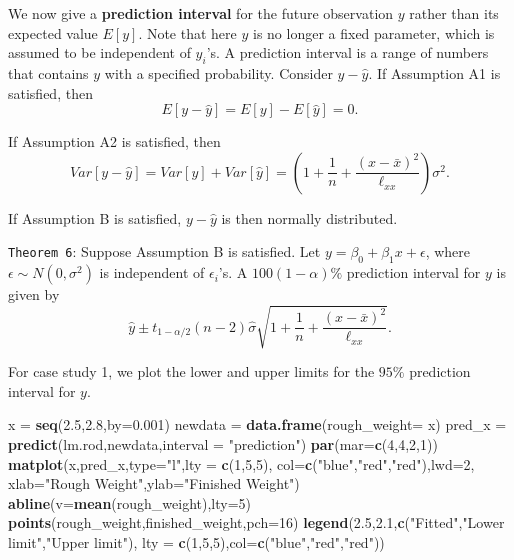 \documentclass[]{article}
\newenvironment{Shaded}{\begin{snugshade}}{\end{snugshade}}
\newcommand{\DataTypeTok}[1]{\textcolor[rgb]{0.13,0.29,0.53}{#1}}
\newcommand{\DecValTok}[1]{\textcolor[rgb]{0.00,0.00,0.81}{#1}}
\newcommand{\FloatTok}[1]{\textcolor[rgb]{0.00,0.00,0.81}{#1}}
\newcommand{\KeywordTok}[1]{\textcolor[rgb]{0.13,0.29,0.53}{\textbf{#1}}}
\newcommand{\NormalTok}[1]{#1}
\newcommand{\StringTok}[1]{\textcolor[rgb]{0.31,0.60,0.02}{#1}}
\begin{document}
We now give a \textbf{prediction interval} for the future observation
\(y\) rather than its expected value \(E[y]\). Note that here \(y\) is
no longer a fixed parameter, which is assumed to be independent of
\(y_i\)'s. A prediction interval is a range of numbers that contains
\(y\) with a specified probability. Consider \(y-\hat y\). If Assumption
A1 is satisfied, then \[E[y-\hat y] = E[y]-E[\hat y]= 0.\]

If Assumption A2 is satisfied, then
\[Var[y-\hat y] = Var[y]+Var[\hat y]=\left(1+\frac{1}{n}+\frac{(x-\bar x)^2}{\ell_{xx}}\right)\sigma^2.\]

If Assumption B is satisfied, \(y-\hat y\) is then normally distributed.

\texttt{Theorem\ 6}: Suppose Assumption B is satisfied. Let
\(y=\beta_0+\beta_1x+\epsilon\), where \(\epsilon\sim N(0,\sigma^2)\) is
independent of \(\epsilon_i\)'s. A \(100(1−\alpha)\%\) prediction
interval for \(y\) is given by
\[\hat y\pm t_{1-\alpha/2}(n-2)\hat{\sigma}\sqrt{1+\frac{1}{n}+\frac{(x-\bar x)^2}{\ell_{xx}}}.\]

For case study 1, we plot the lower and upper limits for the \(95\%\)
prediction interval for \(y\).

\begin{Shaded}
\begin{Highlighting}[]
\NormalTok{x =}\StringTok{ }\KeywordTok{seq}\NormalTok{(}\FloatTok{2.5}\NormalTok{,}\FloatTok{2.8}\NormalTok{,}\DataTypeTok{by=}\FloatTok{0.001}\NormalTok{)}
\NormalTok{newdata =}\StringTok{ }\KeywordTok{data.frame}\NormalTok{(}\DataTypeTok{rough_weight=}\NormalTok{ x)}
\NormalTok{pred_x =}\StringTok{ }\KeywordTok{predict}\NormalTok{(lm.rod,newdata,}\DataTypeTok{interval =} \StringTok{"prediction"}\NormalTok{)}
\KeywordTok{par}\NormalTok{(}\DataTypeTok{mar=}\KeywordTok{c}\NormalTok{(}\DecValTok{4}\NormalTok{,}\DecValTok{4}\NormalTok{,}\DecValTok{2}\NormalTok{,}\DecValTok{1}\NormalTok{))}
\KeywordTok{matplot}\NormalTok{(x,pred_x,}\DataTypeTok{type=}\StringTok{"l"}\NormalTok{,}\DataTypeTok{lty =} \KeywordTok{c}\NormalTok{(}\DecValTok{1}\NormalTok{,}\DecValTok{5}\NormalTok{,}\DecValTok{5}\NormalTok{),}
        \DataTypeTok{col=}\KeywordTok{c}\NormalTok{(}\StringTok{"blue"}\NormalTok{,}\StringTok{"red"}\NormalTok{,}\StringTok{"red"}\NormalTok{),}\DataTypeTok{lwd=}\DecValTok{2}\NormalTok{,}
        \DataTypeTok{xlab=}\StringTok{"Rough Weight"}\NormalTok{,}\DataTypeTok{ylab=}\StringTok{"Finished Weight"}\NormalTok{)}
\KeywordTok{abline}\NormalTok{(}\DataTypeTok{v=}\KeywordTok{mean}\NormalTok{(rough_weight),}\DataTypeTok{lty=}\DecValTok{5}\NormalTok{)}
\KeywordTok{points}\NormalTok{(rough_weight,finished_weight,}\DataTypeTok{pch=}\DecValTok{16}\NormalTok{)}
\KeywordTok{legend}\NormalTok{(}\FloatTok{2.5}\NormalTok{,}\FloatTok{2.1}\NormalTok{,}\KeywordTok{c}\NormalTok{(}\StringTok{"Fitted"}\NormalTok{,}\StringTok{"Lower limit"}\NormalTok{,}\StringTok{"Upper limit"}\NormalTok{),}
       \DataTypeTok{lty =} \KeywordTok{c}\NormalTok{(}\DecValTok{1}\NormalTok{,}\DecValTok{5}\NormalTok{,}\DecValTok{5}\NormalTok{),}\DataTypeTok{col=}\KeywordTok{c}\NormalTok{(}\StringTok{"blue"}\NormalTok{,}\StringTok{"red"}\NormalTok{,}\StringTok{"red"}\NormalTok{))}
\end{Highlighting}
\end{Shaded}
\end{document}
